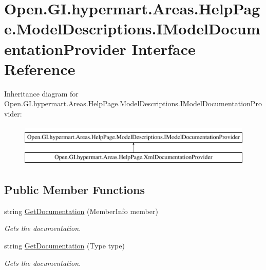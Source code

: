 \hypertarget{interface_open_1_1_g_i_1_1hypermart_1_1_areas_1_1_help_page_1_1_model_descriptions_1_1_i_model_documentation_provider}{}\section{Open.\+G\+I.\+hypermart.\+Areas.\+Help\+Page.\+Model\+Descriptions.\+I\+Model\+Documentation\+Provider Interface Reference}
\label{interface_open_1_1_g_i_1_1hypermart_1_1_areas_1_1_help_page_1_1_model_descriptions_1_1_i_model_documentation_provider}


 


Inheritance diagram for Open.\+G\+I.\+hypermart.\+Areas.\+Help\+Page.\+Model\+Descriptions.\+I\+Model\+Documentation\+Provider\+:\begin{figure}[H]
\begin{center}
\leavevmode
\includegraphics[height=2.000000cm]{interface_open_1_1_g_i_1_1hypermart_1_1_areas_1_1_help_page_1_1_model_descriptions_1_1_i_model_documentation_provider}
\end{center}
\end{figure}
\subsection*{Public Member Functions}
\begin{DoxyCompactItemize}
\item 
string \hyperlink{interface_open_1_1_g_i_1_1hypermart_1_1_areas_1_1_help_page_1_1_model_descriptions_1_1_i_model_documentation_provider_a27d4470da05e52051ae345515c17755a}{Get\+Documentation} (Member\+Info member)
\begin{DoxyCompactList}\small\item\em Gets the documentation. \end{DoxyCompactList}\item 
string \hyperlink{interface_open_1_1_g_i_1_1hypermart_1_1_areas_1_1_help_page_1_1_model_descriptions_1_1_i_model_documentation_provider_a047061b90c62930fc0a1dbcb09732bd3}{Get\+Documentation} (Type type)
\begin{DoxyCompactList}\small\item\em Gets the documentation. \end{DoxyCompactList}\end{DoxyCompactItemize}


